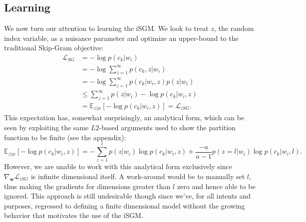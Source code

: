 \documentclass{article} %
\begin{document}
\subsection{Learning}\label{learn_isg}
We now turn our attention to learning the iSGM.  We look to treat $z$, the random index variable, as a nuisance parameter and optimize an upper-bound to the traditional Skip-Gram objective:\begin{equation}\begin{split}\label{iSGM_obj}
\mathcal{L}_{SG} &= - \log p(c_{k} | w_{i}) \\ &= - \log \sum_{z=1}^{\infty} p(c_{k}, z| w_{i}) \\ &= - \log \sum_{z=1}^{\infty} p(c_{k}| w_{i}, z) p(z | w_{i}) \\ &\le  \sum_{z=1}^{\infty} p(z | w_{i}) -\log p(c_{k}| w_{i}, z) \\ &= \mathbb{E}_{z|w}[- \log p( c_{k}| w_{i}, z)] = \mathcal{L}_{iSG}. \end{split}\end{equation}  This expectation has, somewhat surprisingly, an analytical form, which can be seen by exploiting the same $L2$-based arguments used to show the partition function to be finite (see the appendix): \begin{equation}\label{expectation}\mathbb{E}_{z|w}[- \log p( c_{k}| w_{i}, z)] = -\sum_{z=1}^{l} p(z | w_{i})  \log p(c_{k}|w_{i},z) + \frac{-a}{a-1} p(z=l | w_{i}) \log p(c_{k} | w_{i}, l).\end{equation}  However, we are unable to work with this analytical form exclusively since $\nabla_{\mathbf{w}} \mathcal{L}_{iSG}$ is infinite dimensional itself.  A work-around would be to manually set $l$, thus making the gradients for dimensions greater than $l$ zero and hence able to be ignored.  This approach is still undesirable though since we've, for all intents and purposes, regressed to defining a finite dimensional model without the growing behavior that motivates the use of the iSGM. 
\end{document}
